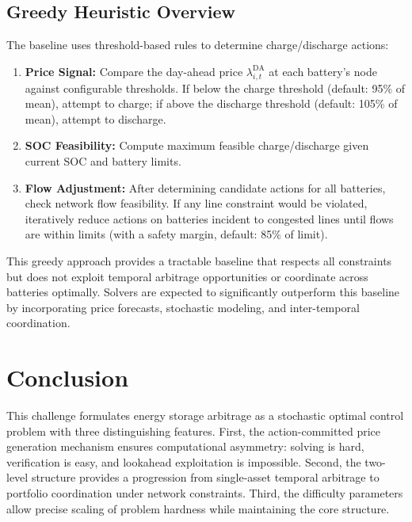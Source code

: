 \documentclass[11pt]{article}
\begin{document}
\subsection{Greedy Heuristic Overview}

The baseline uses threshold-based rules to determine charge/discharge actions:

\begin{enumerate}
    \item \textbf{Price Signal:} Compare the day-ahead price $\lambda^{\text{DA}}_{i,t}$ at each battery's node against configurable thresholds. If below the charge threshold (default: 95\% of mean), attempt to charge; if above the discharge threshold (default: 105\% of mean), attempt to discharge.

    \item \textbf{SOC Feasibility:} Compute maximum feasible charge/discharge given current SOC and battery limits.

    \item \textbf{Flow Adjustment:} After determining candidate actions for all batteries, check network flow feasibility. If any line constraint would be violated, iteratively reduce actions on batteries incident to congested lines until flows are within limits (with a safety margin, default: 85\% of limit).
\end{enumerate}

This greedy approach provides a tractable baseline that respects all constraints but does not exploit temporal arbitrage opportunities or coordinate across batteries optimally. Solvers are expected to significantly outperform this baseline by incorporating price forecasts, stochastic modeling, and inter-temporal coordination.


\section{Conclusion}

This challenge formulates energy storage arbitrage as a stochastic optimal control problem with three distinguishing features. First, the action-committed price generation mechanism ensures computational asymmetry: solving is hard, verification is easy, and lookahead exploitation is impossible. Second, the two-level structure provides a progression from single-asset temporal arbitrage to portfolio coordination under network constraints. Third, the difficulty parameters allow precise scaling of problem hardness while maintaining the core structure.
\end{document}
